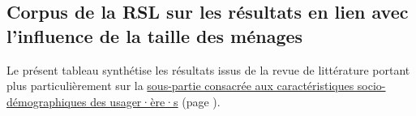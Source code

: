     \newpage
\subsection{Corpus de la \acrshort{RSL} sur les résultats en lien avec l'influence de la taille des ménages}
    \label{donnees-ouvertes:rsl_resultats_taille_menages}

Le présent tableau synthétise les résultats issus de la revue de littérature portant plus particulièrement sur la \hyperref[Caractéristiques socio-démographiques des usagers]{sous-partie consacrée aux caractéristiques socio-démographiques des usager·ère·s} (page \pageref{Caractéristiques socio-démographiques des usagers}).\par


